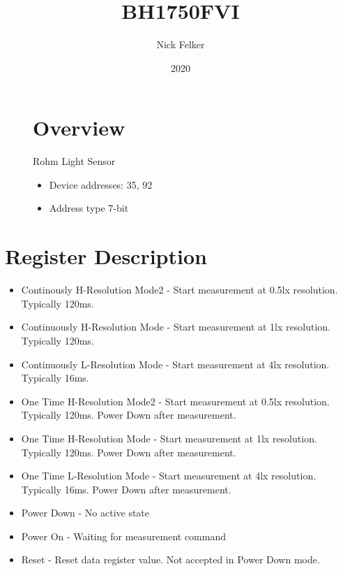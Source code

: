 \documentclass[a4paper,12pt,oneside,pdflatex,italian,final,twocolumn]{article}
\title{ BH1750FVI }
\author{ Nick Felker }
\date{ 2020 }
\begin{document}
\pagestyle{fancy}



\onecolumn


\begin{figure}
\begin{minipage}{0.47\textwidth}

\section{Overview}
    Rohm Light Sensor
    \begin{itemize}
        \item Device addresses:
          35,
          92
        \item Address type 7-bit
    \end{itemize}


\end{minipage}
\hfill

\end{figure}


\section{Register Description}
\begin{itemize}
\item Continously H-Resolution Mode2 - Start measurement at 0.5lx resolution. Typically 120ms.
\item Continuously H-Resolution Mode - Start measurement at 1lx resolution. Typically 120ms.
\item Continuously L-Resolution Mode - Start measurement at 4lx resolution. Typically 16ms.
\item One Time H-Resolution Mode2 - Start measurement at 0.5lx resolution. Typically 120ms. Power Down after measurement.
\item One Time H-Resolution Mode - Start measurement at 1lx resolution. Typically 120ms. Power Down after measurement.
\item One Time L-Resolution Mode - Start measurement at 4lx resolution. Typically 16ms. Power Down after measurement.
\item Power Down - No active state
\item Power On - Waiting for measurement command
\item Reset - Reset data register value. Not accepted in Power Down mode.
\end{itemize}
\end{document}
